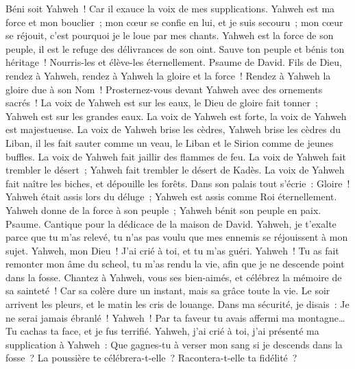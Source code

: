 \begin{multicols}{2}
Béni soit Yahweh~! Car il exauce la voix de mes supplications.
Yahweh est ma force et mon bouclier~; mon cœur se confie en lui, et je suis secouru~; mon cœur se réjouit, c'est pourquoi je le loue par mes chants.
Yahweh est la force de son peuple, il est le refuge des délivrances de son oint.
Sauve ton peuple et bénis ton héritage~! Nourris-les et élève-les éternellement.
\VerseOne{}Psaume de David. Fils de Dieu, rendez à Yahweh, rendez à Yahweh la gloire et la force~!
Rendez à Yahweh la gloire due à son Nom~! Prosternez-vous devant Yahweh avec des ornements sacrés~!
La voix de Yahweh est sur les eaux, le Dieu de gloire fait tonner~; Yahweh est sur les grandes eaux.
La voix de Yahweh est forte, la voix de Yahweh est majestueuse.
La voix de Yahweh brise les cèdres, Yahweh brise les cèdres du Liban,
il les fait sauter comme un veau, le Liban et le Sirion comme de jeunes buffles.
La voix de Yahweh fait jaillir des flammes de feu.
La voix de Yahweh fait trembler le désert~; Yahweh fait trembler le désert de Kadès.
La voix de Yahweh fait naître les biches, et dépouille les forêts. Dans son palais tout s'écrie~: Gloire~!
Yahweh était assis lors du déluge~; Yahweh est assis comme Roi éternellement.
Yahweh donne de la force à son peuple~; Yahweh bénit son peuple en paix.
\VerseOne{}Psaume. Cantique pour la dédicace de la maison de David.
Yahweh, je t'exalte parce que tu m'as relevé, tu n'as pas voulu que mes ennemis se réjouissent à mon sujet.
Yahweh, mon Dieu~! J'ai crié à toi, et tu m'as guéri.
Yahweh~! Tu as fait remonter mon âme du scheol, tu m'as rendu la vie, afin que je ne descende point dans la fosse.
Chantez à Yahweh, vous ses bien-aimés, et célébrez la mémoire de sa sainteté~!
Car sa colère dure un instant, mais sa grâce toute la vie. Le soir arrivent les pleurs, et le matin les cris de louange.
Dans ma sécurité, je disais~: Je ne serai jamais ébranlé~!
Yahweh~! Par ta faveur tu avais affermi ma montagne… Tu cachas ta face, et je fus terrifié.
Yahweh, j'ai crié à toi, j'ai présenté ma supplication à Yahweh~:
Que gagnes-tu à verser mon sang si je descends dans la fosse~? La poussière te célébrera-t-elle~? Racontera-t-elle ta fidélité~?

\end{multicols}
